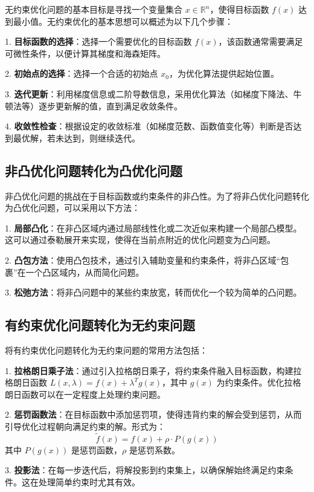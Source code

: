 \documentclass[a4paper]{article}
\begin{document}
无约束优化问题的基本目标是寻找一个变量集合 $x \in \mathbb{R}^n$，使得目标函数 $f(x)$ 达到最小值。无约束优化的基本思想可以概述为以下几个步骤：

1. \textbf{目标函数的选择}：选择一个需要优化的目标函数 $f(x)$，该函数通常需要满足可微性条件，以便计算其梯度和海森矩阵。

2. \textbf{初始点的选择}：选择一个合适的初始点 $x_0$，为优化算法提供起始位置。

3. \textbf{迭代更新}：利用梯度信息或二阶导数信息，采用优化算法（如梯度下降法、牛顿法等）逐步更新解的值，直到满足收敛条件。

4. \textbf{收敛性检查}：根据设定的收敛标准（如梯度范数、函数值变化等）判断是否达到最优解，若未达到，则继续迭代。

\subsection{非凸优化问题转化为凸优化问题}

非凸优化问题的挑战在于目标函数或约束条件的非凸性。为了将非凸优化问题转化为凸优化问题，可以采用以下方法：

1. \textbf{局部凸化}：在非凸区域内通过局部线性化或二次近似来构建一个局部凸模型。这可以通过泰勒展开来实现，使得在当前点附近的优化问题变为凸问题。

2. \textbf{凸包方法}：使用凸包技术，通过引入辅助变量和约束条件，将非凸区域“包裹”在一个凸区域内，从而简化问题。

3. \textbf{松弛方法}：将非凸问题中的某些约束放宽，转而优化一个较为简单的凸问题。

\subsection{有约束优化问题转化为无约束问题}

将有约束优化问题转化为无约束问题的常用方法包括：

1. \textbf{拉格朗日乘子法}：通过引入拉格朗日乘子，将约束条件融入目标函数，构建拉格朗日函数 $L(x, \lambda) = f(x) + \lambda^T g(x)$，其中 $g(x)$ 为约束条件。优化拉格朗日函数可以在一定程度上处理约束问题。

2. \textbf{惩罚函数法}：在目标函数中添加惩罚项，使得违背约束的解会受到惩罚，从而引导优化过程朝向满足约束的解。形式为：
   \[
   \tilde{f}(x) = f(x) + \rho \cdot P(g(x))
   \]
   其中 $P(g(x))$ 是惩罚函数，$\rho$ 是惩罚系数。

3. \textbf{投影法}：在每一步迭代后，将解投影到约束集上，以确保解始终满足约束条件。这在处理简单约束时尤其有效。
\end{document}
